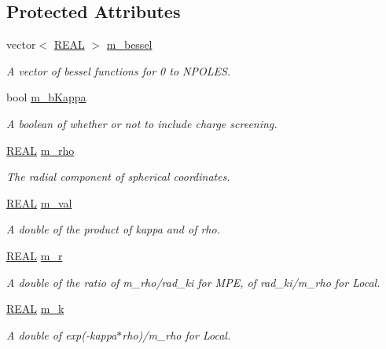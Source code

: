 \subsection*{Protected Attributes}
\begin{DoxyCompactItemize}
\item 
vector$<$ \hyperlink{util_8h_a5821460e95a0800cf9f24c38915cbbde}{R\-E\-A\-L} $>$ \hyperlink{classCRExpan_a7e1b20ce607fcf2650ddbfca1f2b97a0}{m\-\_\-bessel}
\begin{DoxyCompactList}\small\item\em A vector of bessel functions for 0 to N\-P\-O\-L\-E\-S. \end{DoxyCompactList}\item 
bool \hyperlink{classCRExpan_a4da0a777c6bb220946cb921e4b45e987}{m\-\_\-b\-Kappa}
\begin{DoxyCompactList}\small\item\em A boolean of whether or not to include charge screening. \end{DoxyCompactList}\item 
\hyperlink{util_8h_a5821460e95a0800cf9f24c38915cbbde}{R\-E\-A\-L} \hyperlink{classCRExpan_a7957dc7c75cb4f62d8e387c63ec82692}{m\-\_\-rho}
\begin{DoxyCompactList}\small\item\em The radial component of spherical coordinates. \end{DoxyCompactList}\item 
\hyperlink{util_8h_a5821460e95a0800cf9f24c38915cbbde}{R\-E\-A\-L} \hyperlink{classCRExpan_ad4aa5ad1140a14d8d51dc65054797739}{m\-\_\-val}
\begin{DoxyCompactList}\small\item\em A double of the product of kappa and of rho. \end{DoxyCompactList}\item 
\hyperlink{util_8h_a5821460e95a0800cf9f24c38915cbbde}{R\-E\-A\-L} \hyperlink{classCRExpan_a7a51c089318b660b6dd29f4b200d55ca}{m\-\_\-r}
\begin{DoxyCompactList}\small\item\em A double of the ratio of m\-\_\-rho/rad\-\_\-ki for M\-P\-E, of rad\-\_\-ki/m\-\_\-rho for Local. \end{DoxyCompactList}\item 
\hyperlink{util_8h_a5821460e95a0800cf9f24c38915cbbde}{R\-E\-A\-L} \hyperlink{classCRExpan_a8c07810ecf1ec1138d0f035295561072}{m\-\_\-k}
\begin{DoxyCompactList}\small\item\em A double of exp(-\/kappa$\ast$rho)/m\-\_\-rho for Local. \end{DoxyCompactList}\end{DoxyCompactItemize}
